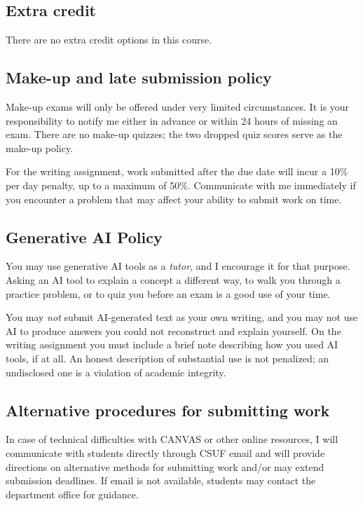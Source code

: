 \documentclass{syllabus}
\begin{document}
\subsection*{Extra credit}

There are no extra credit options in this course.

\subsection*{Make-up and late submission policy}

Make-up exams will only be offered under very limited circumstances. It is your responsibility to notify me either in advance or within 24 hours of missing an exam. There are no make-up quizzes; the two dropped quiz scores serve as the make-up policy.

For the writing assignment, work submitted after the due date will incur a 10\% per day penalty, up to a maximum of 50\%. Communicate with me immediately if you encounter a problem that may affect your ability to submit work on time.

\subsection*{Generative AI Policy}

You may use generative AI tools as a \textit{tutor}, and I encourage it for that purpose. Asking an AI tool to explain a concept a different way, to walk you through a practice problem, or to quiz you before an exam is a good use of your time.

You may \textit{not} submit AI-generated text as your own writing, and you may not use AI to produce answers you could not reconstruct and explain yourself. On the writing assignment you must include a brief note describing how you used AI tools, if at all. An honest description of substantial use is not penalized; an undisclosed one is a violation of academic integrity.

\subsection*{Alternative procedures for submitting work}

In case of technical difficulties with CANVAS or other online resources, I will communicate with students directly through CSUF email and will provide directions on alternative methods for submitting work and/or may extend submission deadlines. If email is not available, students may contact the department office for guidance.
\end{document}
